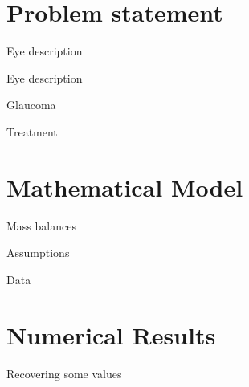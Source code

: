 \documentclass[9pt]{beamer}
\title{}
\begin{document}
\begin{frame}{}
  \maketitle
\end{frame}

\section{Problem statement}

\begin{frame}{Eye description}

\end{frame}

\begin{frame}{Eye description}

\end{frame}

\begin{frame}{Glaucoma}

\end{frame}

\begin{frame}{Treatment}

\end{frame}

\section{Mathematical Model}

\begin{frame}{Mass balances}

\end{frame}

\begin{frame}{Assumptions}

\end{frame}

\begin{frame}{Data}

\end{frame}

\section{Numerical Results}

\begin{frame}{Recovering some values}

\end{frame}
\end{document}
